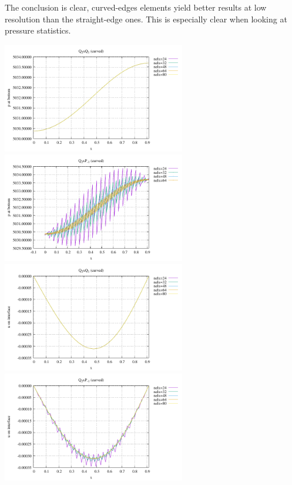 The conclusion is clear, curved-edges elements yield better results at low resolution
than the straight-edge ones. This is especially clear when looking at pressure statistics.

\begin{center}
\includegraphics[width=8cm]{python_codes/fieldstone_25/newresults/pbottom_q2q1.pdf}
\includegraphics[width=8cm]{python_codes/fieldstone_25/newresults/pbottom_q2p1.pdf}\\
\includegraphics[width=8cm]{python_codes/fieldstone_25/newresults/u_interface_q2q1.pdf}
\includegraphics[width=8cm]{python_codes/fieldstone_25/newresults/u_interface_q2p1.pdf}\\

\end{center}
